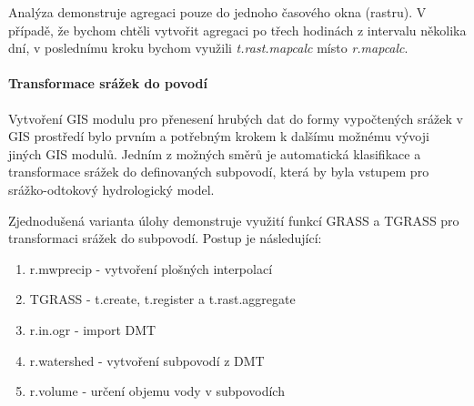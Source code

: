 \documentclass[a4paper,12pt,oneside]{report}
\begin{document}
Analýza demonstruje agregaci pouze do jednoho časového okna
(rastru). V případě, že bychom chtěli vytvořit agregaci po třech
hodinách z intervalu několika dní, v poslednímu kroku bychom využili
\textit{t.rast.mapcalc} místo \textit{r.mapcalc}.


\bigskip
\newpage
\paragraph*{Transformace srážek do povodí}
Vytvoření GIS modulu pro přenesení hrubých dat do formy vypočtených
srážek v GIS prostředí bylo prvním a potřebným krokem k dalšímu
možnému vývoji jiných GIS modulů. Jedním z možných směrů je
automatická klasifikace a transformace srážek do definovaných
subpovodí, která by byla vstupem pro srážko-odtokový hydrologický
model.

Zjednodušená varianta úlohy demonstruje využití funkcí GRASS a TGRASS
pro transformaci srážek do subpovodí. Postup je následující:

\begin{enumerate}
\item r.mwprecip - vytvoření plošných interpolací
\item TGRASS - t.create, t.register a t.rast.aggregate
\item r.in.ogr - import   \acs{DMT}
\item r.watershed -  vytvoření subpovodí z DMT
\item r.volume - určení objemu vody v subpovodích 
\end{enumerate}
\end{document}
